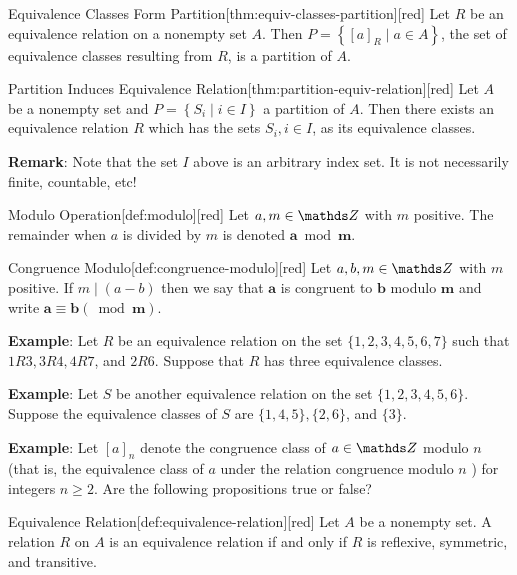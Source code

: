 \documentclass[10pt]{article}
\theoremstyle{definition}
\theoremstyle{plain}
\numberwithin{equation}{section}
\begin{document}
\begin{define}{Equivalence Classes Form Partition}[thm:equiv-classes-partition][red]
  Let $R$ be an equivalence relation on a nonempty set $A$. Then $P=\left\{[a]_R \mid a \in A\right\}$, the set of equivalence classes resulting from $R$, is a partition of $A$.
\end{define}
\begin{define}{Partition Induces Equivalence Relation}[thm:partition-equiv-relation][red]
  Let $A$ be a nonempty set and $P=\left\{S_i \mid i \in I\right\}$ a partition of $A$. Then there exists an equivalence relation $R$ which has the sets $S_i, i \in I$, as its equivalence classes.
\end{define}

\textbf{Remark}: Note that the set $I$ above is an arbitrary index set. It is not necessarily finite, countable, etc!


\begin{define}{Modulo Operation}[def:modulo][red]
  Let $a, m \in \setZ$ with $m$ positive. The remainder when $a$ is divided by $m$ is denoted $\boldsymbol{a} \bmod \boldsymbol{m}$.
\end{define}
\begin{define}{Congruence Modulo}[def:congruence-modulo][red]
  Let $a, b, m \in \setZ$ with $m$ positive. If $m \mid(a-b)$ then we say that 
  $\boldsymbol{a}$ is congruent to $\boldsymbol{b}$ modulo $\boldsymbol{m}$ and 
  write $\boldsymbol{a} \equiv \boldsymbol{b}(\bmod \boldsymbol{m})$.
\end{define}






\textbf{Example}: Let $R$ be an equivalence relation on the set $\{1,2,3,4,5,6,7\}$ such that $1 R 3,3 R 4,4 R 7$, and $2 R 6$. Suppose that $R$ has three equivalence classes.



\textbf{Example}: Let $S$ be another equivalence relation on the set $\{1,2,3,4,5,6\}$. Suppose the equivalence classes of $S$ are $\{1,4,5\},\{2,6\}$, and $\{3\}$.

\textbf{Example}: Let $[a]_n$ denote the congruence class of $a \in \setZ$ modulo $n$ (that is, the equivalence class of $a$ under the relation congruence modulo $n$ ) for integers $n \geq 2$. Are the following propositions true or false?








\newpage
\begin{define}{Equivalence Relation}[def:equivalence-relation][red]
  Let $A$ be a nonempty set. A relation $R$ on $A$ is an equivalence relation if and only if $R$ is reflexive, symmetric, and transitive.
\end{define}
\end{document}
